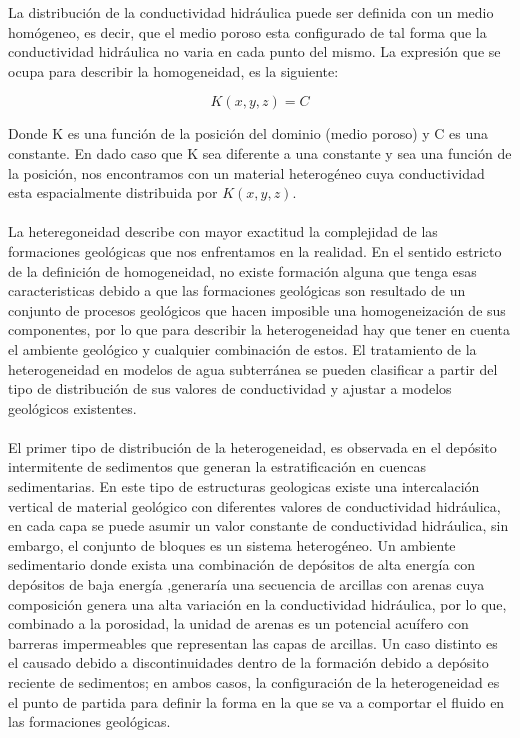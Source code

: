 La distribución de la conductividad hidráulica puede ser definida con un medio homógeneo, es decir, que el medio poroso esta configurado de tal forma que la conductividad hidráulica no varia en cada punto del mismo. La expresión que se ocupa para describir la homogeneidad, es la siguiente:

\begin{equation}
\label{eqn:phi11}
K(x,y,z)= C
\end{equation}

Donde K es una función de la posición del dominio (medio poroso) y C es una constante. En dado caso que K sea diferente a una constante y sea una función de la posición, nos encontramos con un material heterogéneo cuya conductividad esta espacialmente distribuida por $K(x,y,z)$.  
\\
\\
La heteregoneidad describe con mayor exactitud la complejidad de las formaciones geológicas que nos enfrentamos en la realidad. En el sentido estricto de la definición de homogeneidad, no existe formación alguna que tenga esas caracteristicas debido a que las formaciones geológicas son resultado de un conjunto de procesos geológicos que hacen imposible una homogeneización de sus componentes, por lo que para describir la heterogeneidad hay que tener en cuenta el ambiente geológico y cualquier combinación de estos. El tratamiento de la heterogeneidad en modelos de agua subterránea se pueden clasificar a partir del tipo de distribución de sus valores de conductividad y ajustar a modelos geológicos existentes.
\\
\\
El primer tipo de distribución de la heterogeneidad, es observada en el depósito intermitente de sedimentos que generan la estratificación en cuencas sedimentarias. En este tipo de estructuras geologicas existe una intercalación vertical de material geológico con diferentes valores de conductividad hidráulica, en cada capa se puede asumir un valor constante de conductividad hidráulica, sin embargo, el conjunto de bloques es un sistema heterogéneo. Un ambiente sedimentario donde exista una combinación de depósitos de alta energía con depósitos de baja energía ,generaría una secuencia de arcillas con arenas cuya composición genera una alta variación en la conductividad hidráulica, por lo que, combinado a la porosidad, la unidad de arenas es un potencial acuífero con barreras impermeables que representan las capas de arcillas. Un caso distinto es el causado debido a discontinuidades dentro de la formación debido a depósito reciente de sedimentos; en ambos casos, la configuración de la heterogeneidad es el punto de partida para definir la forma en la que se va a comportar el fluido en las formaciones geológicas. 
